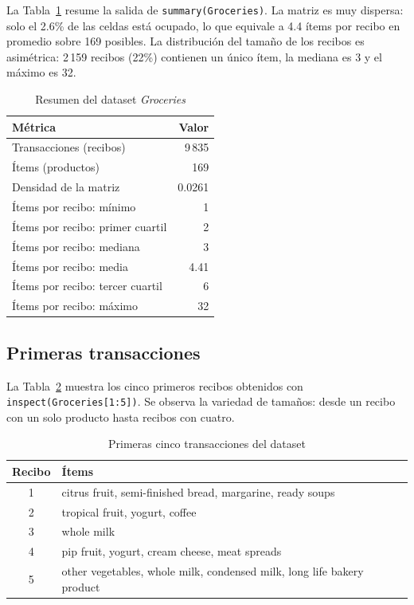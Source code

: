 \documentclass[11pt,a4paper]{article}
\begin{document}
La Tabla~\ref{tab:summary} resume la salida de \texttt{summary(Groceries)}. La matriz es muy
dispersa: solo el 2.6\% de las celdas está ocupado, lo que equivale a 4.4 ítems por recibo en
promedio sobre 169 posibles. La distribución del tamaño de los recibos es asimétrica: 2\,159
recibos (22\%) contienen un único ítem, la mediana es 3 y el máximo es 32.

\begin{table}[H]
  \centering
  \caption{Resumen del dataset \emph{Groceries}}
  \label{tab:summary}
  \begin{tabular}{lr}
    \toprule
    Métrica & Valor \\
    \midrule
    Transacciones (recibos) & 9\,835 \\
    Ítems (productos) & 169 \\
    Densidad de la matriz & 0.0261 \\
    Ítems por recibo: mínimo & 1 \\
    Ítems por recibo: primer cuartil & 2 \\
    Ítems por recibo: mediana & 3 \\
    Ítems por recibo: media & 4.41 \\
    Ítems por recibo: tercer cuartil & 6 \\
    Ítems por recibo: máximo & 32 \\
    \bottomrule
  \end{tabular}
\end{table}

\subsection{Primeras transacciones}

La Tabla~\ref{tab:first5} muestra los cinco primeros recibos obtenidos con
\texttt{inspect(Groceries[1:5])}. Se observa la variedad de tamaños: desde un recibo con un
solo producto hasta recibos con cuatro.

\begin{table}[H]
  \centering
  \caption{Primeras cinco transacciones del dataset}
  \label{tab:first5}
  \begin{tabular}{cl}
    \toprule
    Recibo & Ítems \\
    \midrule
    1 & citrus fruit, semi-finished bread, margarine, ready soups \\
    2 & tropical fruit, yogurt, coffee \\
    3 & whole milk \\
    4 & pip fruit, yogurt, cream cheese, meat spreads \\
    5 & other vegetables, whole milk, condensed milk, long life bakery product \\
    \bottomrule
  \end{tabular}
\end{table}
\end{document}
